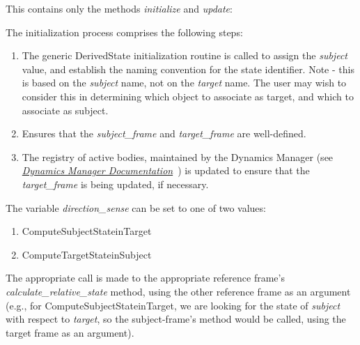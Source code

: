 \begin{itemize}
\label{ref:RelativeDerivedState}

This contains only the methods \textit{initialize} and \textit{update}:
\begin{enumerate}
The initialization process comprises the following steps:
\begin{enumerate}
\item{} The generic DerivedState initialization routine is called to assign the \textit{subject} value, and establish the naming convention for the state identifier.  Note - this is based on the \textit{subject} name, not on the \textit{target} name.  The user may wish to consider this in determining which object to associate as target, and which to associate as subject.
\item{} Ensures that the \textit{subject\_frame} and \textit{target\_frame} are well-defined.
\item{} The registry of active bodies, maintained by the Dynamics Manager (see \href{file:\JEODHOME/models/dynamics/dyn_manager/docs/dyn_manager.pdf}{\em Dynamics Manager Documentation}~\cite{dynenv:DYNMANAGER}) is updated to ensure that the \textit{target\_frame} is being updated, if necessary.
\end{enumerate}

The variable \textit{direction\_sense} can be set to one of two values:
\begin{enumerate}
\item{ComputeSubjectStateinTarget}
\item{ComputeTargetStateinSubject}
\end{enumerate}

The appropriate call is made to the appropriate reference frame's \textit{calculate\_relative\_state} method, using the other reference frame as an argument (e.g., for ComputeSubjectStateinTarget, we are looking for the state of \textit{subject} with respect to \textit{target}, so the subject-frame's method would be called, using the target frame as an argument).


\end{enumerate}
\end{itemize}



